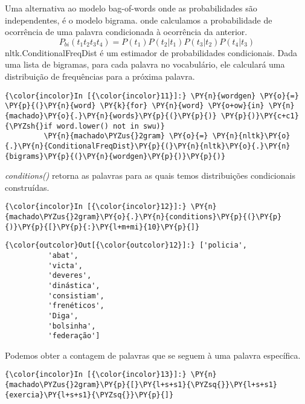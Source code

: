Uma alternativa ao modelo bag-of-words onde as probabilidades são
independentes, é o modelo bigrama. onde calculamos a probabilidade de
ocorrência de uma palavra condicionada à ocorrência da anterior.
\[P_{bi}(t_1t_2t_3t_4) = P(t_1)P(t_2|t_1)P(t_3|t_2)P(t_4|t_3)\]
nltk.ConditionalFreqDist é um estimador de probabilidades condicionais.
Dada uma lista de bigramas, para cada palavra no vocabulário, ele
calculará uma distribuição de frequências para a próxima palavra.

    \begin{Verbatim}[commandchars=\\\{\}]
{\color{incolor}In [{\color{incolor}11}]:} \PY{n}{wordgen} \PY{o}{=} \PY{p}{(}\PY{n}{word} \PY{k}{for} \PY{n}{word} \PY{o+ow}{in} \PY{n}{machado}\PY{o}{.}\PY{n}{words}\PY{p}{(}\PY{p}{)} \PY{p}{)}\PY{c+c1}{\PYZsh{}if word.lower() not in swu)}
         \PY{n}{machado\PYZus{}2gram} \PY{o}{=} \PY{n}{nltk}\PY{o}{.}\PY{n}{ConditionalFreqDist}\PY{p}{(}\PY{n}{nltk}\PY{o}{.}\PY{n}{bigrams}\PY{p}{(}\PY{n}{wordgen}\PY{p}{)}\PY{p}{)}
\end{Verbatim}

    \emph{conditions()} retorna as palavras para as quais temos
distribuições condicionais construídas.

    \begin{Verbatim}[commandchars=\\\{\}]
{\color{incolor}In [{\color{incolor}12}]:} \PY{n}{machado\PYZus{}2gram}\PY{o}{.}\PY{n}{conditions}\PY{p}{(}\PY{p}{)}\PY{p}{[}\PY{p}{:}\PY{l+m+mi}{10}\PY{p}{]}
\end{Verbatim}

            \begin{Verbatim}[commandchars=\\\{\}]
{\color{outcolor}Out[{\color{outcolor}12}]:} ['policia',
          'abat',
          'victa',
          'deveres',
          'dinástica',
          'consistiam',
          'frenéticos',
          'Diga',
          'bolsinha',
          'federação']
\end{Verbatim}
        
    Podemos obter a contagem de palavras que se seguem à uma palavra
específica.

    \begin{Verbatim}[commandchars=\\\{\}]
{\color{incolor}In [{\color{incolor}13}]:} \PY{n}{machado\PYZus{}2gram}\PY{p}{[}\PY{l+s+s1}{\PYZsq{}}\PY{l+s+s1}{exercia}\PY{l+s+s1}{\PYZsq{}}\PY{p}{]}
\end{Verbatim}

